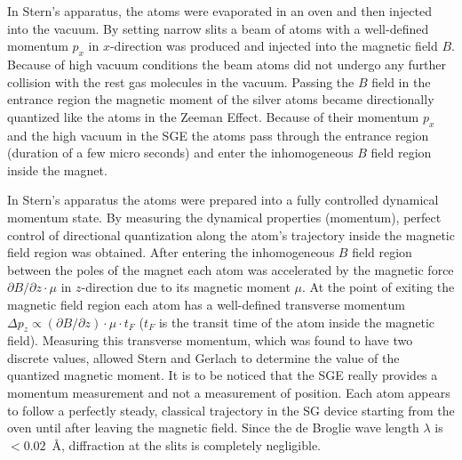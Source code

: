 \documentclass{article}
\begin{document}
In Stern's apparatus, the atoms were evaporated in an oven and then injected into the vacuum. By setting narrow slits a beam of atoms with a well-defined momentum $p_x$ in $x$-direction was produced and injected into the magnetic field $B$. Because of high vacuum conditions the beam atoms did not undergo any further collision with the rest gas molecules in the vacuum. Passing the $B$ field in the entrance region the magnetic moment of the silver atoms became directionally quantized like the atoms in the Zeeman Effect. Because of their momentum $p_x$ and the high vacuum in the SGE the atoms pass through the entrance region (duration of a few micro seconds) and enter the inhomogeneous $B$ field region inside the magnet. 

In Stern's apparatus the atoms were prepared into a fully controlled dynamical momentum state. By measuring the dynamical properties (momentum), perfect control of directional quantization along the atom's trajectory inside the magnetic field region was obtained. After entering the inhomogeneous $B$ field region between the poles of the magnet each atom was accelerated by the magnetic force $\partial B/\partial z\cdot \mu$ in $z$-direction due to its magnetic moment $\mu$. At the point of exiting the magnetic field region each atom has a well-defined transverse momentum $\Delta p_z\propto (\partial B/\partial z) \cdot \mu \cdot t_F$ ($t_F$ is the transit time of the atom inside the magnetic field). Measuring this transverse momentum, which was found to have two discrete values, allowed Stern and Gerlach to determine the value of the quantized magnetic moment. It is to be noticed that the SGE really provides a momentum measurement and not a measurement of position.  Each atom appears to follow a perfectly steady, classical trajectory in the SG device starting from the oven until after leaving the magnetic field. Since the de Broglie wave length $\lambda$ is $< 0.02$~\AA, diffraction at the slits is completely negligible. 
\end{document}
